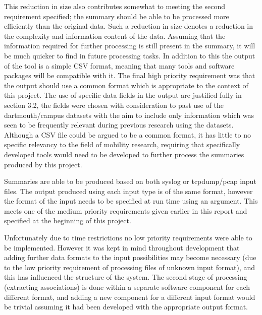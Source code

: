 This reduction in size also contributes somewhat to meeting the second requirement specified; the summary should be able to be processed more efficiently than the original data. Such a reduction in size denotes a reduction in the complexity and information content of the data. Assuming that the information required for further processing is still present in the summary, it will be much quicker to find in future processing tasks. In addition to this the output of the tool is a simple CSV format, meaning that many tools and software packages will be compatible with it.
The final high priority requirement was that the output should use a common format which is appropriate to the context of this project. The use of specific data fields in the output are justified fully in section 3.2, the fields were chosen with consideration to past use of the dartmouth/campus datasets with the aim to include only information which was seen to be frequently relevant during previous research using the datasets. Although a CSV file could be argued to be a common format, it has little to no specific relevancy to the field of mobility research, requiring that specifically developed tools would need to be developed to further process the summaries produced by this project. 

Summaries are able to be produced based on both syslog or tcpdump/pcap input files. The output produced using each input type is of the same format, however the format of the input needs to be specified at run time using an argument. This meets one of the medium priority requirements given earlier in this report and specified at the beginning of this project.

Unfortunately due to time restrictions no low priority requirements were able to be implemented. However it was kept in mind throughout development that adding further data formats to the input possibilities may become necessary (due to the low priority requirement of processing files of unknown input format), and this has influenced the structure of the system. The second stage of processing (extracting associations) is done within a separate software component for each different format, and adding a new component for a different input format would be trivial assuming it had been developed with the appropriate output format.
